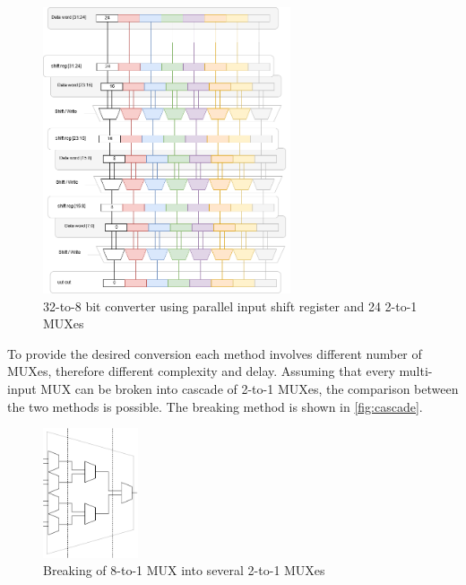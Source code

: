 \begin{figure}[h]
\centering
\includegraphics[width=0.65\textwidth]{figures/Shift_2.png}
\caption{32-to-8 bit converter using parallel input shift register and 24 2-to-1 MUXes}
\label{fig:shift}
\end{figure}

To provide the desired conversion each method involves different number of MUXes, therefore different complexity and delay. Assuming that every multi-input MUX can be broken into cascade of 2-to-1 MUXes, the comparison between the two methods is possible. The breaking method is shown in \autoref{fig:cascade}.

\begin{figure}[h]
\centering
\includegraphics[width=0.25\textwidth]{figures/cascade.png}
\caption{Breaking of 8-to-1 MUX into several 2-to-1 MUXes}
\label{fig:cascade}
\end{figure}

